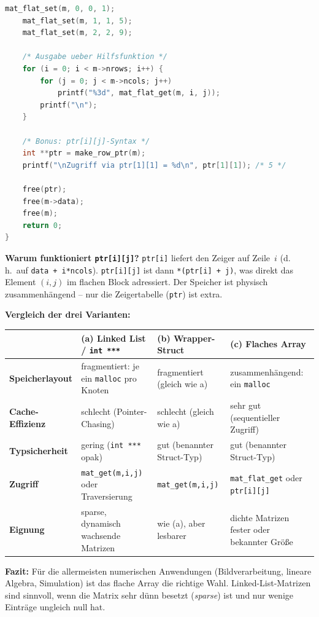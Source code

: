 \begin{enumerate}[a)]
\begin{loesung}
\begin{lstlisting}[language=C]
    mat_flat_set(m, 0, 0, 1);
    mat_flat_set(m, 1, 1, 5);
    mat_flat_set(m, 2, 2, 9);

    /* Ausgabe ueber Hilfsfunktion */
    for (i = 0; i < m->nrows; i++) {
        for (j = 0; j < m->ncols; j++)
            printf("%3d", mat_flat_get(m, i, j));
        printf("\n");
    }

    /* Bonus: ptr[i][j]-Syntax */
    int **ptr = make_row_ptr(m);
    printf("\nZugriff via ptr[1][1] = %d\n", ptr[1][1]); /* 5 */

    free(ptr);
    free(m->data);
    free(m);
    return 0;
}
\end{lstlisting}

\textbf{Warum funktioniert \texttt{ptr[i][j]}?}
\texttt{ptr[i]} liefert den Zeiger auf Zeile~$i$ (d.\,h.\ auf \texttt{data + i*ncols}).
\texttt{ptr[i][j]} ist dann \texttt{*(ptr[i] + j)}, was direkt das Element $(i,j)$ im
flachen Block adressiert.
Der Speicher ist physisch zusammenhängend -- nur die Zeigertabelle (\texttt{ptr}) ist extra.

\bigskip
\textbf{Vergleich der drei Varianten:}

\begin{center}
\renewcommand{\arraystretch}{1.4}
\begin{tabular}{p{3cm}p{3.2cm}p{3.2cm}p{3.2cm}}
\hline
 & \textbf{(a) Linked List /} \texttt{int ***}
 & \textbf{(b) Wrapper-Struct}
 & \textbf{(c) Flaches Array} \\
\hline
\textbf{Speicherlayout}
  & fragmentiert: je ein \texttt{malloc} pro Knoten
  & fragmentiert (gleich wie a)
  & zusammenhängend: ein \texttt{malloc} \\
\textbf{Cache-Effizienz}
  & schlecht (Pointer-Chasing)
  & schlecht (gleich wie a)
  & sehr gut (sequentieller Zugriff) \\
\textbf{Typsicherheit}
  & gering (\texttt{int ***} opak)
  & gut (benannter Struct-Typ)
  & gut (benannter Struct-Typ) \\
\textbf{Zugriff}
  & \texttt{mat\_get(m,i,j)} oder Traversierung
  & \texttt{mat\_get(m,i,j)}
  & \texttt{mat\_flat\_get} oder \texttt{ptr[i][j]} \\
\textbf{Eignung}
  & sparse, dynamisch wachsende Matrizen
  & wie (a), aber lesbarer
  & dichte Matrizen fester oder bekannter Größe \\
\hline
\end{tabular}
\end{center}

\textbf{Fazit:} Für die allermeisten numerischen Anwendungen (Bildverarbeitung, lineare Algebra,
Simulation) ist das flache Array die richtige Wahl. Linked-List-Matrizen sind sinnvoll, wenn die
Matrix sehr dünn besetzt (\emph{sparse}) ist und nur wenige Einträge ungleich null hat.
\end{loesung}

\end{enumerate}

